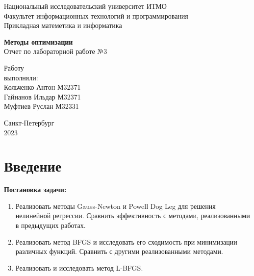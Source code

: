 \documentclass[a4paper,14pt,oneside,openany]{memoir}
\title{}
\author{}
\begin{document}
\thispagestyle{empty}

\begin{center}
	
	Национальный исследовательский университет ИТМО\\
	Факультет информационных технологий и программирования\\
	Прикладная матеметика и информатика\\
	
	\vspace{20pt}
	
\end{center}

\vfill

\begin{center}
	\textbf {\fontsize{100}{120}\selectfont Методы оптимизации
	} \\  
	Отчет по лабораторной работе №3
	
\end{center}

\vfill

\begin{flushright}
	
	\hfill {
		Работу \\
		выполняли: \\
		Кольченко Антон М32371 \\ 
		Гайнанов Ильдар М32371 \\ 
		Муфтиев Руслан М32331\\ 
	}
	\vspace{20pt}
	
\end{flushright}

\vfill

\begin{center}
	Санкт-Петербург\\
	2023
\end{center}

\chapter*{Введение}
\textbf{Постановка задачи:}

\begin{enumerate}
\item Реализовать методы Gauss-Newton и Powell Dog Leg для решения нелинейной регрессии. Сравнить эффективность с методами, реализованными в предыдущих работах.
\item Реализовать метод BFGS и исследовать его сходимость при минимизации различных функций. Сравнить с другими реализованными методами.
\item Реализовать и исследовать метод L-BFGS.
\end{enumerate}
\end{document}
